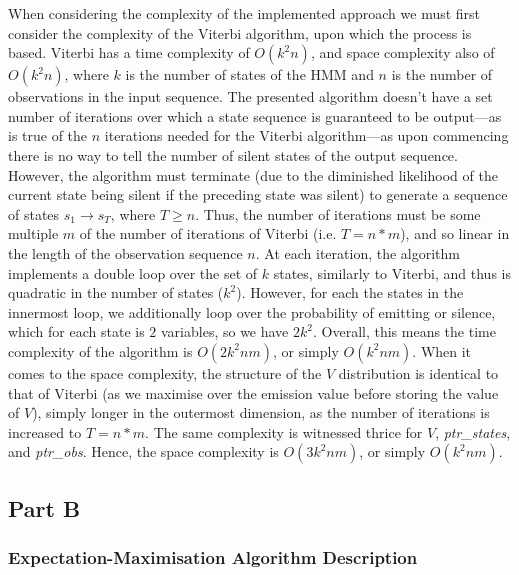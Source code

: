 \documentclass[a4paper, 11pt]{article}
\begin{document}
	When considering the complexity of the implemented approach we must first consider the complexity of the Viterbi algorithm, upon which the process is based. Viterbi has a time complexity of $O\left(k^{2}n\right)$, and space complexity also of $O\left(k^{2} n\right)$, where $k$ is the number of states of the HMM and $n$ is the number of observations in the input sequence. The presented algorithm doesn't have a set number of iterations over which a state sequence is guaranteed to be output---as is true of the $n$ iterations needed for the Viterbi algorithm---as upon commencing there is no way to tell the number of silent states of the output sequence. However, the algorithm must terminate (due to the diminished likelihood of the current state being silent if the preceding state was silent) to generate a sequence of states $s_{1} \to s_{T}$, where $T \geq n$. Thus, the number of iterations must be some multiple $m$ of the number of iterations of Viterbi (i.e. $T = n * m$), and so linear in the length of the observation sequence $n$. At each iteration, the algorithm implements a double loop over the set of $k$ states, similarly to Viterbi, and thus is quadratic in the number of states ($k^{2}$). However, for each the states in the innermost loop, we additionally loop over the probability of emitting or silence, which for each state is $2$ variables, so we have $2k^{2}$. Overall, this means the time complexity of the algorithm is $O\left(2k^{2}nm\right)$, or simply $O\left(k^{2}nm\right)$. When it comes to the space complexity, the structure of the $V$ distribution is identical to that of Viterbi (as we maximise over the emission value before storing the value of $V$), simply longer in the outermost dimension, as the number of iterations is increased to $T = n * m$. The same complexity is witnessed thrice for $V$, \emph{ptr\_states}, and \emph{ptr\_obs}. Hence, the space complexity is $O\left(3k^{2}nm\right)$, or simply $O\left(k^{2}nm\right)$.
	
	
	\subsection{Part B}
	\subsubsection{Expectation-Maximisation Algorithm Description}
	
\end{document}
